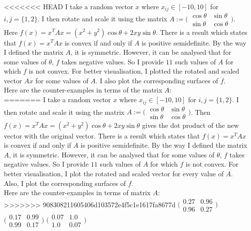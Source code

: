 \documentclass{article}
\begin{document}
\begin{flushleft}
<<<<<<< HEAD
I take a random vector $x$ where $x_{ij}\in[-10,10]$ for $i,j=\{1,2\}$. I then rotate and scale it using the matrix $A:=\Big(\begin{matrix}\cos\theta & \sin\theta \\ \sin\theta & \cos\theta\end{matrix}\Big)$. Here $f(x)=x^{T}Ax=(x^{2}+y^{2})\cos\theta+2xy\sin\theta$. There is a result which states that $f(x)=x^{T}Ax$ is convex if and only if $A$ is positive semidefinite. By the way I defined the matrix $A$, it is symmetric. However, it can be analysed that for some values of $\theta$, $f$ takes negative values. So I provide $11$ such values of $A$ for which $f$ is not convex. For better visualisation, I plotted the rotated and scaled vector $Ax$ for some values of $A$. I also plot the corresponding surfaces of $f$.\\
Here are the counter-examples in terms of the matrix $A$:\\
=======
I take a random vector $x$ where $x_{ij}\in[-10,10]$ for $i,j=\{1,2\}$. I then rotate and scale it using the matrix $A:=\Big(\begin{matrix}\cos\theta & \sin\theta \\ \sin\theta & \cos\theta\end{matrix}\Big)$. Then $f(x)=x^{T}Ax=(x^{2}+y^{2})\cos\theta+2xy\sin\theta$ gives the dot product of the new vector with the original vector. There is a result which states that $f(x)=x^{T}Ax$ is convex if and only if $A$ is positive semidefinite. By the way I defined the matrix $A$, it is symmetric. However, it can be analysed that for some values of $\theta$, $f$ takes negative values. So I provide $11$ such values of $A$ for which $f$ is not convex. For better visualisation, I plot the rotated and scaled vector for every value of $A$. Also, I plot the corresponding surfaces of $f$.\\
Here are the counter-examples in terms of matrix $A$:\\
>>>>>>> 908308211605406d103572e4f5c1e1617fa8677d
$\Big(\begin{matrix}0.27 & 0.96 \\ 0.96 & 0.27\end{matrix}\Big)$
$\Big(\begin{matrix}0.17 & 0.99 \\ 0.99 & 0.17\end{matrix}\Big)$
$\Big(\begin{matrix}0.07 & 1.0 \\ 1.0 & 0.07\end{matrix}\Big)$

\end{flushleft}
\end{document}
